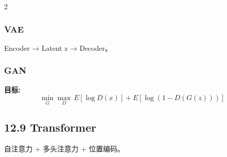 \documentclass[6pt,a4paper]{ctexart}
\begin{document}
\begin{multicols}{2}
\subsubsection*{VAE}
Encoder → Latent z → Decoder。

\subsubsection*{GAN}
\textbf{目标:}
$$ \min_G \max_D \, E[\log D(x)] + E[\log(1-D(G(z)))] $$

\subsection*{12.9 Transformer}
自注意力 + 多头注意力 + 位置编码。

\end{multicols}
\end{document}
